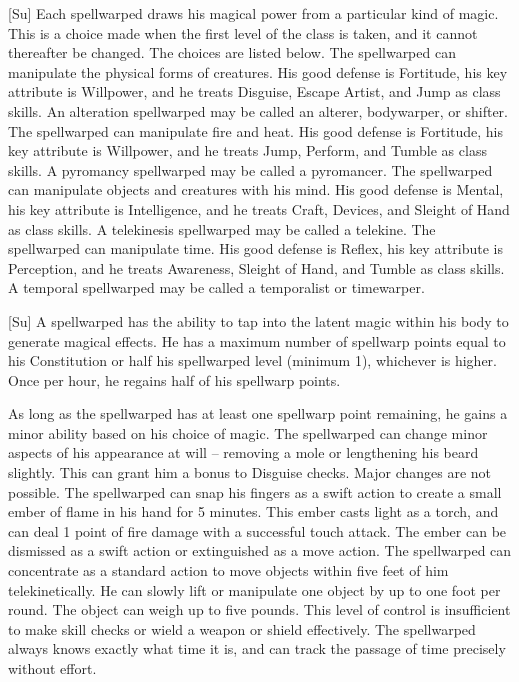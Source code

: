 [Su]
Each spellwarped draws his magical power from a particular kind of magic.
This is a choice made when the first level of the class is taken, and it cannot thereafter be changed.
The choices are listed below.
The spellwarped can manipulate the physical forms of creatures.
His good defense is Fortitude, his key attribute is Willpower, and he treats Disguise, Escape Artist, and Jump as class skills.
An alteration spellwarped may be called an alterer, bodywarper, or shifter.
The spellwarped can manipulate fire and heat.
His good defense is Fortitude, his key attribute is Willpower, and he treats Jump, Perform, and Tumble as class skills.
A pyromancy spellwarped may be called a pyromancer.
The spellwarped can manipulate objects and creatures with his mind.
His good defense is Mental, his key attribute is Intelligence, and he treats Craft, Devices, and Sleight of Hand as class skills.
A telekinesis spellwarped may be called a telekine.
The spellwarped can manipulate time.
His good defense is Reflex, his key attribute is Perception, and he treats Awareness, Sleight of Hand, and Tumble as class skills.
A temporal spellwarped may be called a temporalist or timewarper.

[Su]
A spellwarped has the ability to tap into the latent magic within his body to generate magical effects.
He has a maximum number of spellwarp points equal to his Constitution or half his spellwarped level (minimum 1), whichever is higher.
Once per hour, he regains half of his spellwarp points.

As long as the spellwarped has at least one spellwarp point remaining, he gains a minor ability based on his choice of magic.
The spellwarped can change minor aspects of his appearance at will -- removing a mole or lengthening his beard slightly.
This can grant him a  bonus to Disguise checks.
Major changes are not possible.
The spellwarped can snap his fingers as a swift action to create a small ember of flame in his hand for 5 minutes.
This ember casts light as a torch, and can deal 1 point of fire damage with a successful touch attack.
The ember can be dismissed as a swift action or extinguished as a move action.
The spellwarped can concentrate as a standard action to move objects within five feet of him telekinetically.
He can slowly lift or manipulate one object by up to one foot per round.
The object can weigh up to five pounds.
This level of control is insufficient to make skill checks or wield a weapon or shield effectively.
The spellwarped always knows exactly what time it is, and can track the passage of time precisely without effort.

